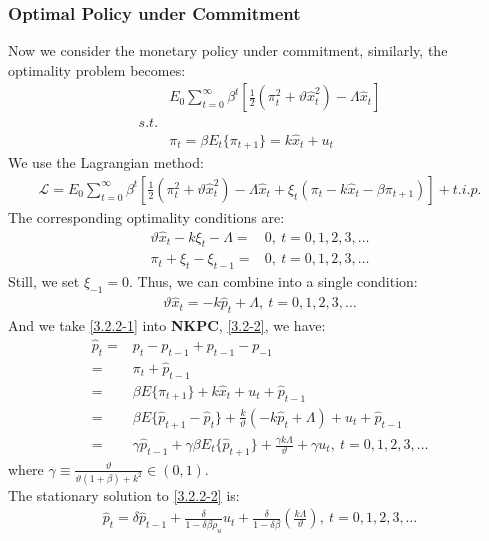 \documentclass{article}
\numberwithin{equation}{section}
\begin{document}
\subsubsection{Optimal Policy under Commitment}
Now we consider the monetary policy under commitment, similarly, the optimality problem becomes:
	\begin{align*}
		&E_0 \sum\limits^\infty_{t=0} \beta^t \left[ \frac{1}{2}(\pi^2_t + \vartheta \hat{x}^2_t) - \Lambda \hat{x}_t \right]\\
		s.t.&\\
		&\pi_t = \beta E_t\{ \pi_{t+1} \} =k\hat{x}_t + u_t
	\end{align*}
We use the Lagrangian method:
	\begin{align*}
		\mathscr{L} = E_0 \sum\limits^\infty_{t=0} \beta^t \left[ \frac{1}{2}(\pi^2_t + \vartheta \hat{x}^2_t) - \Lambda \hat{x}_t + \xi_t(\pi_t - k\hat{x}_t - \beta\pi_{t+1}) \right] + t.i.p.
	\end{align*}
The corresponding optimality conditions are:
	\begin{align*}
		\vartheta\hat{x}_t - k\xi_t - \Lambda = &0,\ t = 0, 1, 2, 3, \ldots\\
		\pi_t + \xi_t - \xi_{t-1} = &0,\ t = 0, 1, 2, 3, \ldots
	\end{align*}
Still, we set $\xi_{-1} = 0$. Thus, we can combine into a single condition:
	\begin{align}
		\vartheta\hat{x}_t = -k\hat{p}_t + \Lambda,\ t = 0, 1, 2, 3, \ldots \label{3.2.2-1}
	\end{align}
And we take \eqref{3.2.2-1} into \textbf{NKPC}, \eqref{3.2-2}, we have:
	\begin{align}
		\hat{p}_t = &p_t - p_{t-1} + p_{t-1} - p_{-1} \nonumber\\
		= &\pi_t + \hat{p}_{t-1} \nonumber\\
		= &\beta E\{ \pi_{t+1} \} + k\hat{x}_t + u_t + \hat{p}_{t-1} \nonumber\\
		= &\beta E\{ \hat{p}_{t+1} - \hat{p}_t \} + \frac{k}{\vartheta}(-k\hat{p}_t + \Lambda) + u_t + \hat{p}_{t-1} \nonumber\\
		= &\gamma\hat{p}_{t-1} + \gamma\beta E_t\{ \hat{p}_{t+1} \} + \frac{\gamma k \Lambda}{\vartheta} + \gamma u_t,\ t = 0, 1, 2, 3, \ldots \label{3.2.2-2}
	\end{align}
where $\gamma \equiv \frac{\vartheta}{\vartheta(1 + \beta) + k^2} \in (0, 1)$.\\
The stationary solution to \eqref{3.2.2-2} is:
	\begin{align}
		\hat{p}_t = \delta\hat{p}_{t-1} + \frac{\delta}{1 - \delta\beta\rho_u}u_t + \frac{\delta}{1 - \delta\beta}\left( \frac{k\Lambda}{\vartheta} \right),\ t = 0, 1, 2, 3, \ldots \label{3.2.2-3}
	\end{align}
\end{document}

